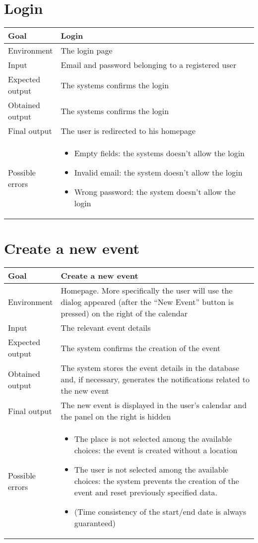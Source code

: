 \documentclass[10pt,a4paper,titlepage]{article}
\begin{document}
\section{Login}
\begin{tabular}{| p{0.2\linewidth} | p{0.8\linewidth} |}
\hline Goal & Login \\
\hline Environment & The login page \\
\hline Input & Email and password belonging to a registered user \\
\hline Expected output & The systems confirms the login \\
\hline Obtained output & The systems confirms the login \\
\hline Final output & The user is redirected to his homepage \\
\hline Possible errors &
\begin{itemize}
\item Empty fields: the systems doesn’t allow the login
\item Invalid email: the system doesn’t allow the login
\item Wrong password: the system doesn’t allow the login
\end{itemize}\\
\hline
\end{tabular}


\section{Create a new event}
\begin{tabular}{| p{0.2\linewidth} | p{0.8\linewidth} |}
\hline Goal & Create a new event \\
\hline Environment & Homepage. More specifically the user will use the dialog appeared
(after the “New Event” button is pressed) on the right of the calendar \\
\hline Input & The relevant event details \\
\hline Expected output & The system confirms the creation of the event \\
\hline Obtained output & The system stores the event details in the database and, if
necessary, generates the notifications related to the new event \\
\hline Final output & The new event is displayed in the user’s calendar and the panel on
the right is hidden \\
\hline Possible errors &
\begin{itemize}
\item The place is not selected among the available choices: the event is
created without a location
\item The user is not selected among the available choices: the system
prevents the creation of the event and reset previously specified data.
\item (Time consistency of the start/end date is always guaranteed)
\end{itemize}\\
\hline
\end{tabular}
\end{document}
